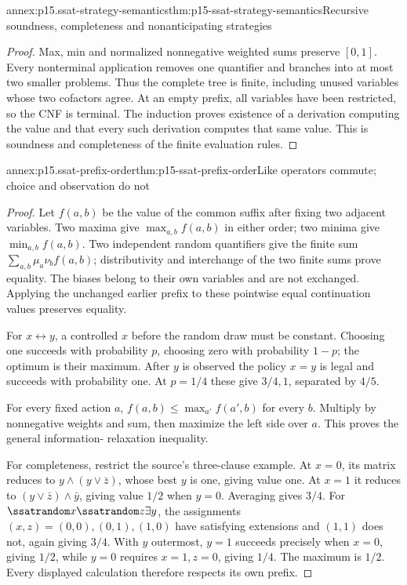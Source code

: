 \begin{annexitem}{annex:p15.ssat-strategy-semantics}{thm:p15-ssat-strategy-semantics}{Recursive soundness, completeness and nonanticipating strategies}
\begin{proof}
Max, min and normalized nonnegative weighted sums preserve \([0,1]\).
Every nonterminal application removes one quantifier and branches into
at most two smaller problems. Thus the complete tree is finite,
including unused variables whose two cofactors agree. At an empty
prefix, all variables have been restricted, so the CNF is terminal.
The induction proves existence of a derivation computing the value
and that every such derivation computes that same value. This is
soundness and completeness of the finite evaluation rules.
\end{proof}
\end{annexitem}

\begin{annexitem}{annex:p15.ssat-prefix-order}{thm:p15-ssat-prefix-order}{Like operators commute; choice and observation do not}
\begin{proof}
Let \(f(a,b)\) be the value of the common suffix after fixing two
adjacent variables. Two maxima give \(\max_{a,b}f(a,b)\) in either
order; two minima give \(\min_{a,b}f(a,b)\). Two independent random
quantifiers give the finite sum
\(\sum_{a,b}\mu_a\nu_bf(a,b)\); distributivity and interchange
of the two finite sums prove equality. The biases belong to their own
variables and are not exchanged. Applying the unchanged earlier
prefix to these pointwise equal continuation values preserves equality.

For \(x\leftrightarrow y\), a controlled \(x\) before the
random draw must be constant. Choosing one succeeds with probability
\(p\), choosing zero with probability \(1-p\); the optimum is
their maximum. After \(y\) is observed the policy \(x=y\)
is legal and succeeds with probability one. At \(p=1/4\) these
give \(3/4,1\), separated by \(4/5\).

For every fixed action \(a\), \(f(a,b)\leq\max_{a'}f(a',b)\)
for every \(b\). Multiply by nonnegative weights and sum, then
maximize the left side over \(a\). This proves the general information-
relaxation inequality.

For completeness, restrict the source's three-clause example. At
\(x=0\), its matrix reduces to \(y\land(y\lor\bar z)\),
whose best \(y\) is one, giving value one. At \(x=1\) it
reduces to \((y\lor\bar z)\land\bar y\), giving value
\(1/2\) when \(y=0\). Averaging gives \(3/4\).
For \(\ssatrandom x\ssatrandom z\exists y\), the assignments
\((x,z)=(0,0),(0,1),(1,0)\) have satisfying extensions and
\((1,1)\) does not, again giving \(3/4\). With \(y\)
outermost, \(y=1\) succeeds precisely when \(x=0\), giving
\(1/2\), while \(y=0\) requires \(x=1,z=0\), giving
\(1/4\). The maximum is \(1/2\). Every displayed calculation
therefore respects its own prefix.
\end{proof}
\end{annexitem}

